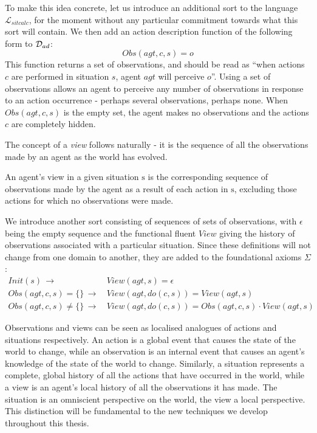 To make this idea concrete, let us introduce an additional sort 
to the language $\mathcal{L}_{sitcalc}$, for the moment without any
particular commitment towards what this sort will contain. We then
add an action description function of the following form to $\mathcal{D}_{ad}$:\[
Obs(agt,c,s)=o\]
 This function returns a set of observations, and should be read as
{}``when actions $c$ are performed in situation $s$, agent $agt$
will perceive $o$''. Using a set of observations allows an agent
to perceive any number of observations in response to an action occurrence
- perhaps several observations, perhaps none. When $Obs(agt,c,s)$
is the empty set, the agent makes no observations and the actions
$c$ are completely hidden.

The concept of a \emph{view} follows naturally - it is the sequence
of all the observations made by an agent as the world has evolved.

\begin{defnL}
[{Views}] An agent's view in a given situation $\mathrm{s}$
is the corresponding sequence of observations made by the agent as
a result of each action in $\mathrm{s}$, excluding those actions
for which no observations were made. 
\end{defnL}
We introduce another sort  consisting of sequences of sets
of observations, with $\epsilon$ being the empty sequence and the
functional fluent $View$ giving the history of observations associated
with a particular situation. Since these definitions will not change
from one domain to another, they are added to the foundational axioms
$\Sigma$:\begin{align}
Init(s)\,\rightarrow & \, View(agt,s)=\epsilon\nonumber \\
Obs(agt,c,s)=\{\}\,\rightarrow & \, View(agt,do(c,s))=View(agt,s)\nonumber \\
Obs(agt,c,s)\neq\{\}\,\rightarrow & \, View(agt,do(c,s))=Obs(agt,c,s)\cdot View(agt,s)\label{eq:view_defn}\end{align}


Observations and views can be seen as localised analogues of actions
and situations respectively. An action is a global event that causes
the state of the world to change, while an observation is an internal
event that causes an agent's knowledge of the state of the world to
change. Similarly, a situation represents a complete, global history
of all the actions that have occurred in the world, while a view is
an agent's local history of all the observations it has made. The
situation is an omniscient perspective on the world, the view a local
perspective. This distinction will be fundamental to the new techniques
we develop throughout this thesis.\\


